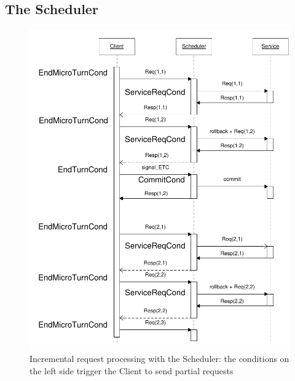     \subsection{The Scheduler}
    
    	\begin{figure}[htp]
          \centering
          \includegraphics[scale=0.8]{figures/SchedulerDiagEng.pdf}
          \caption{Incremental request processing with the Scheduler: the conditions on the left side trigger the Client to send partial requests}
          \label{fig:schedchrono}
        \end{figure}

